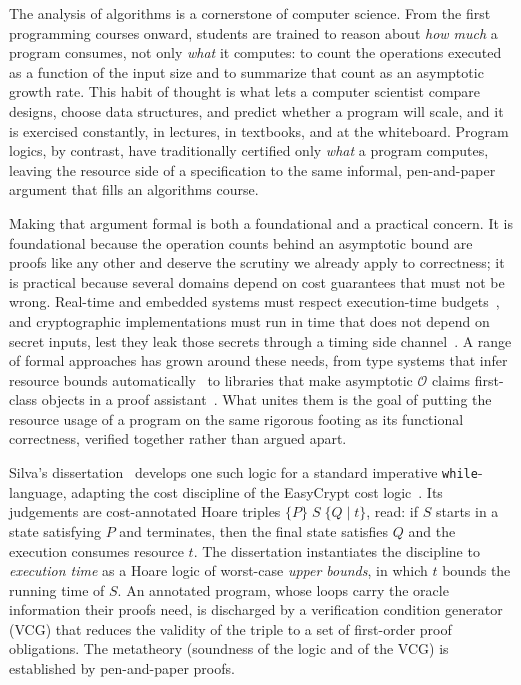 \documentclass[runningheads]{llncs}
\newcommand{\triple}[4]{\{#1\}\;#2\;\{#3 \mid #4\}}
\newcommand{\BigO}{\mathcal{O}}
\newcommand{\code}[1]{\texttt{#1}}
\begin{document}
The analysis of algorithms is a cornerstone of computer science.
From the first programming courses onward, students are trained to reason about
\emph{how much} a program consumes, not only \emph{what} it computes: to count
the operations executed as a function of the input size and to summarize that
count as an asymptotic growth rate.
This habit of thought is what lets a computer scientist compare designs, choose
data structures, and predict whether a program will scale, and it is exercised
constantly, in lectures, in textbooks, and at the whiteboard.
Program logics, by contrast, have traditionally certified only \emph{what} a
program computes, leaving the resource side of a specification to the same
informal, pen-and-paper argument that fills an algorithms course.

Making that argument formal is both a foundational and a practical concern.
It is foundational because the operation counts behind an asymptotic bound are
proofs like any other and deserve the scrutiny we already apply to correctness;
it is practical because several domains depend on cost guarantees that must not
be wrong.
Real-time and embedded systems must respect execution-time
budgets~\cite{Wilhelm2008}, and cryptographic implementations must run in time
that does not depend on secret inputs, lest they leak those secrets through a
timing side channel~\cite{Barbosa2021,Almeida2016}.
A range of formal approaches has grown around these needs, from type systems
that infer resource bounds automatically~\cite{HofmannJost2003,Hoffmann2012} to
libraries that make asymptotic $\BigO$ claims first-class objects in a proof
assistant~\cite{Gueneau2018}.
What unites them is the goal of putting the resource usage of a program on the
same rigorous footing as its functional correctness, verified together rather
than argued apart.

Silva's dissertation~\cite{Silva2022} develops one such logic for a standard
imperative \code{while}-language, adapting the cost discipline of the EasyCrypt
cost logic~\cite{Barbosa2021}.
Its judgements are cost-annotated Hoare triples $\triple{P}{S}{Q}{t}$, read: if
$S$ starts in a state satisfying $P$ and terminates, then the final state
satisfies $Q$ and the execution consumes resource $t$.
The dissertation instantiates the discipline to \emph{execution time} as a Hoare
logic of worst-case \emph{upper bounds}, in which $t$ bounds the running time of
$S$.
An annotated program, whose loops carry the oracle information their proofs need,
is discharged by a verification condition generator (VCG) that reduces the
validity of the triple to a set of first-order proof obligations.
The metatheory (soundness of the logic and of the VCG) is established
by pen-and-paper proofs.
\end{document}

